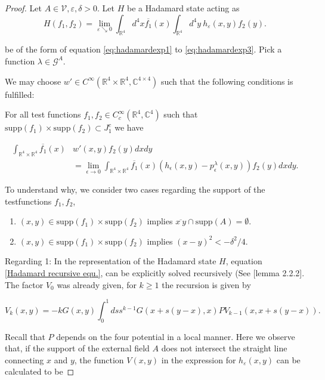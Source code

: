 \documentclass[b5paper,draft,openbib,12pt]{memoir}
\begin{document}
\begin{proof}
Let \(A\in \mathcal{V}, \varepsilon, \delta>0\).
  Let \(H\) be a Hadamard state acting as 
\begin{equation}
H(f_1,f_2)=\lim_{\varepsilon\searrow 0} \int_{\mathbb{R}^4}d^4 x \overline{f_1}(x) \int_{\mathbb{R}^4} d^4y ~h_\varepsilon(x,y) f_2(y).
\end{equation}

be of the form of equation \eqref{eq:hadamardexp1} to \eqref{eq:hadamardexp3}. 
Pick a function \(\lambda\in \mathcal{G}^A\). 

We may choose \(w'\in C^\infty(\mathbb{R}^4\times\mathbb{R}^4,\mathbb{C}^{4\times 4})\)
such that the following conditions is fulfilled:

For all test functions \(f_1,f_2\in C_c^\infty(\mathbb{R}^4,\mathbb{C}^4)\) such that \( \mathrm{supp}(f_1)\times \mathrm{supp}(f_2) \subset J_1^c \)
we have

\begin{align}\label{eq:conditionfull}
\int_{\mathbb{R}^4\times\mathbb{R}^4} \overline{f_1}(x)& w'(x,y)f_2(y)dxdy \\
&=\lim_{\epsilon\rightarrow 0}\int_{\mathbb{R}^4\times\mathbb{R}^4} \overline{f_1}(x)(h_\epsilon (x,y)-p^\lambda_\epsilon(x,y)) f_2(y)dxdy.
\end{align}

To understand why, we consider two cases regarding the support of the testfunctions \(f_1,f_2\), 
\begin{enumerate}
\item \((x,y)\in\mathrm{supp}(f_1)\times\mathrm{supp}(f_2)\)
implies \(\overline{x~y}\cap \mathrm{supp}(A)=\emptyset\).
\item \((x,y)\in\mathrm{supp}(f_1)\times\mathrm{supp}(f_2)\)
implies \((x-y)^2<-\delta^2/4\).
\end{enumerate}

Regarding 1: In the representation of the Hadamard state \(H\), equation \eqref{Hadamard recursive equ.}, can be explicitly 
solved recursively (See \cite{bar2007wave}[lemma 2.2.2]. The factor \(V_0\) was already given, for \(k\ge 1\) the recursion is given by

\begin{equation}\label{eq:line integral}
V_k(x,y)=-k G(x,y) \int_0^1 ds s^{k-1} G(x+ s(y-x),x) P V_{k-1}(x,x+s(y-x)).
\end{equation}

Recall that \(P\) depends on the four potential in a local manner.
Here we observe  that, if the support of the external field \(A\) does not intersect the straight line connecting \(x\) and \(y\), the function
\(V(x,y)\) in the expression for \(h_\varepsilon(x,y)\) can be calculated to be


\end{proof}
\end{document}
